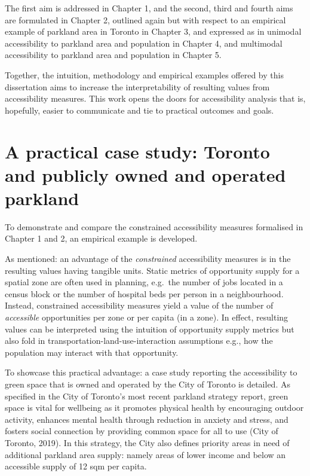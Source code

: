 \documentclass[
11pt, %
oneside, %
english, %
singlespacing, %
]{macthesis} %
\begin{document}
The first aim is addressed in Chapter 1, and the second, third and fourth aims are formulated in Chapter 2, outlined again but with respect to an empirical example of parkland area in Toronto in Chapter 3, and expressed as in unimodal accessibility to parkland area and population in Chapter 4, and multimodal accessibility to parkland area and population in Chapter 5.

Together, the intuition, methodology and empirical examples offered by this dissertation aims to increase the interpretability of resulting values from accessibility measures. This work opens the doors for accessibility analysis that is, hopefully, easier to communicate and tie to practical outcomes and goals.

\section{A practical case study: Toronto and publicly owned and operated parkland}\label{a-practical-case-study-toronto-and-publicly-owned-and-operated-parkland}

To demonstrate and compare the constrained accessibility measures formalised in Chapter 1 and 2, an empirical example is developed.

As mentioned: an advantage of the \emph{constrained} accessibility measures is in the resulting values having tangible units. Static metrics of opportunity supply for a spatial zone are often used in planning, e.g.~the number of jobs located in a census block or the number of hospital beds per person in a neighbourhood. Instead, constrained accessibility measures yield a value of the number of \emph{accessible} opportunities per zone or per capita (in a zone). In effect, resulting values can be interpreted using the intuition of opportunity supply metrics but also fold in transportation-land-use-interaction assumptions e.g., how the population may interact with that opportunity.

To showcase this practical advantage: a case study reporting the accessibility to green space that is owned and operated by the City of Toronto is detailed. As specified in the City of Toronto's most recent parkland strategy report, green space is vital for wellbeing as it promotes physical health by encouraging outdoor activity, enhances mental health through reduction in anxiety and stress, and fosters social connection by providing common space for all to use (City of Toronto, 2019). In this strategy, the City also defines priority areas in need of additional parkland area supply: namely areas of lower income and below an accessible supply of 12 sqm per capita.
\end{document}
